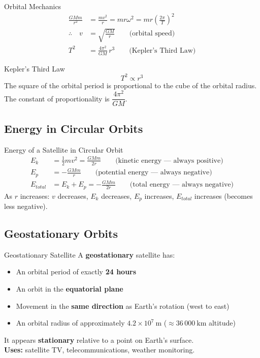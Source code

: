 \documentclass[12pt,a4paper]{article}
\begin{document}
\begin{formulabox}{Orbital Mechanics}
\begin{align*}
\frac{GMm}{r^2} &= \frac{mv^2}{r} = mr\omega^2 = mr\left(\frac{2\pi}{T}\right)^2 \\[1em]
\therefore\quad v &= \sqrt{\frac{GM}{r}} \qquad \text{(orbital speed)}\\[0.8em]
T^2 &= \frac{4\pi^2}{GM}\,r^3 \qquad \text{(Kepler's Third Law)}
\end{align*}
\end{formulabox}

\begin{keybox}{Kepler's Third Law}
$$T^2 \propto r^3$$
The square of the orbital period is proportional to the cube of the orbital radius. The constant of proportionality is $\dfrac{4\pi^2}{GM}$.
\end{keybox}

\subsection{Energy in Circular Orbits}

\begin{formulabox}{Energy of a Satellite in Circular Orbit}
\begin{align*}
E_k &= \frac{1}{2}mv^2 = \frac{GMm}{2r} \qquad \text{(kinetic energy — always positive)}\\
E_p &= -\frac{GMm}{r} \qquad \text{(potential energy — always negative)}\\
E_{total} &= E_k + E_p = -\frac{GMm}{2r} \qquad \text{(total energy — always negative)}
\end{align*}
As $r$ increases: $v$ decreases, $E_k$ decreases, $E_p$ increases, $E_{total}$ increases (becomes less negative).
\end{formulabox}

\subsection{Geostationary Orbits}

\begin{definitionbox}{Geostationary Satellite}
A \textbf{geostationary} satellite has:
\begin{itemize}[itemsep=2pt]
  \item An orbital period of exactly \textbf{24 hours}
  \item An orbit in the \textbf{equatorial plane}
  \item Movement in the \textbf{same direction} as Earth's rotation (west to east)
  \item An orbital radius of approximately $4.2 \times 10^7\ \text{m}$ ($\approx 36\,000\ \text{km}$ altitude)
\end{itemize}
It appears \textbf{stationary} relative to a point on Earth's surface.\\[0.3em]
\textbf{Uses:} satellite TV, telecommunications, weather monitoring.
\end{definitionbox}
\end{document}
